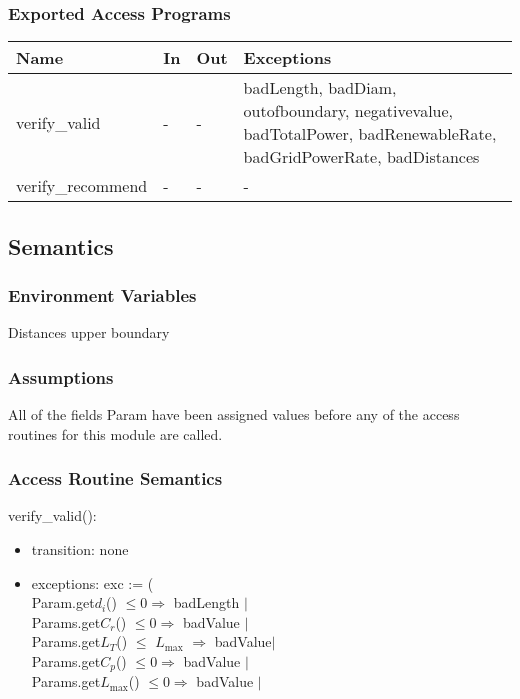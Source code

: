 \documentclass[12pt, titlepage]{article}
\begin{document}
 \subsubsection{Exported Access Programs}

 \begin{center}
 \begin{tabular}{p{3cm} p{1cm} p{1cm} p{9cm}}
 \hline
 \textbf{Name} & \textbf{In} & \textbf{Out} & \textbf{Exceptions} \\
 \hline
 verify\_valid & - & - & badLength, badDiam, outofboundary, negativevalue,
                        badTotalPower, badRenewableRate, badGridPowerRate,
                        badDistances\\
 \hline
 verify\_recommend & - & - & - \\
 \hline
 \end{tabular}
 \end{center}

 \subsection{Semantics}

\subsubsection{Environment Variables}
Distances upper boundary

 \subsubsection{Assumptions}

All of the fields Param have been assigned values before any of the access
 routines for this module are called.

 \subsubsection{Access Routine Semantics}

 verify\_valid(): 
 \begin{itemize}
 \item transition: none
 \item exceptions: exc := (\\
 Param.get$d_i$() $\leq 0 \Rightarrow$ badLength $|$\\
 Params.get$C_r$() $\leq 0 \Rightarrow$ badValue $|$\\
 Params.get$L_T$() $\leq$ $L_\text{max}$ $\Rightarrow$ badValue$|$\\
 Params.get$C_p$() $\leq 0 \Rightarrow$ badValue $|$\\
 Params.get$L_\text{max}$() $\leq 0 \Rightarrow$ badValue $|$\\ 
 \end{itemize}
\end{document}
